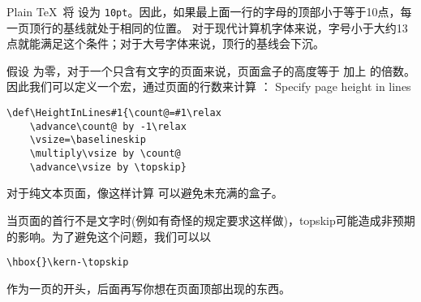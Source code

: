\documentclass{book}
\begin{document}
Plain \TeX\ 将  设为 {\tt 10pt}。因此，如果最上面一行的字母的顶部小于等于10点，每一页顶行的基线就处于相同的位置。
对于现代计算机字体来说，字号小于大约13点就能满足这个条件；对于大号字体来说，顶行的基线会下沉。

假设  为零，对于一个只含有文字的页面来说，页面盒子的高度等于  加上  的倍数。
因此我们可以定义一个宏，通过页面的行数来计算 ：
\howto Specify page height in lines\par
\begin{verbatim}
\def\HeightInLines#1{\count@=#1\relax
    \advance\count@ by -1\relax
    \vsize=\baselineskip
    \multiply\vsize by \count@
    \advance\vsize by \topskip}
\end{verbatim}
对于纯文本页面，像这样计算  可以避免未充满的盒子。

当页面的首行不是文字时(例如有奇怪的规定要求这样做)，topskip可能造成非预期的影响。为了避免这个问题，我们可以以
\begin{verbatim}
\hbox{}\kern-\topskip
\end{verbatim}
作为一页的开头，后面再写你想在页面顶部出现的东西。
\end{document}
